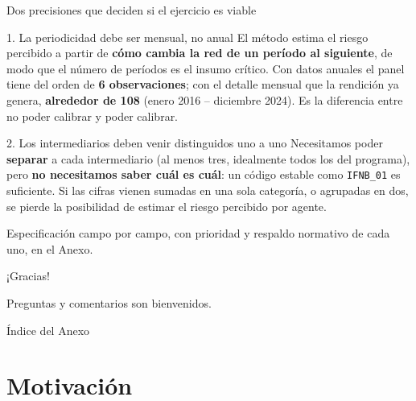 \documentclass[aspectratio=169]{beamer}
\begin{document}
\begin{frame}{Dos precisiones que deciden si el ejercicio es viable}
\begin{block}{1. La periodicidad debe ser mensual, no anual}
El método estima el riesgo percibido a partir de \textbf{cómo cambia la red de un período al siguiente}, de modo que el número de períodos es el insumo crítico. Con datos anuales el panel tiene del orden de \textbf{6 observaciones}; con el detalle mensual que la rendición ya genera, \textbf{alrededor de 108} (enero 2016 -- diciembre 2024). Es la diferencia entre no poder calibrar y poder calibrar.
\end{block}

\vspace{0.2cm}
\begin{block}{2. Los intermediarios deben venir distinguidos uno a uno}
Necesitamos poder \textbf{separar} a cada intermediario (al menos tres, idealmente todos los del programa), pero \textbf{no necesitamos saber cuál es cuál}: un código estable como \texttt{IFNB\_01} es suficiente. Si las cifras vienen sumadas en una sola categoría, o agrupadas en dos, se pierde la posibilidad de estimar el riesgo percibido por agente.
\end{block}

\vspace{0.2cm}
\footnotesize Especificación campo por campo, con prioridad y respaldo normativo de cada uno, en el Anexo.
\end{frame}

\begin{frame}{}
\vfill
\centering
\Large{¡Gracias!}

\vspace{0.4cm}
\normalsize Preguntas y comentarios son bienvenidos.
\vfill
\end{frame}

\appendix

\begin{frame}{Índice del Anexo}
\tableofcontents
\end{frame}

\section{Motivación}
\end{document}
